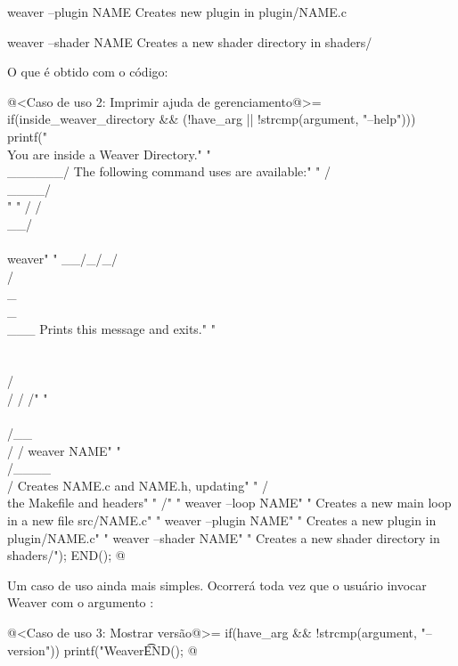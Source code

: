 {                          weaver --plugin NAME
                           Creates new plugin in plugin/NAME.c

                          weaver --shader NAME
                           Creates a new shader directory in shaders/
\alinhanormal

O que é obtido com o código:

\iniciocodigo
@<Caso de uso 2: Imprimir ajuda de gerenciamento@>=
if(inside_weaver_directory && (!have_arg || !strcmp(argument, "--help"))){
  printf("       \\                You are inside a Weaver Directory.\n"
  "        \\______/        The following command uses are available:\n"
  "        /\\____/\\\n"
  "       / /\\__/\\ \\       weaver\n"
  "    __/_/_/\\/\\_\\_\\___     Prints this message and exits.\n"
  "      \\ \\ \\/\\/ / /\n"
  "       \\ \\/__\\/ /       weaver NAME\n"
  "        \\/____\\/          Creates NAME.c and NAME.h, updating\n"
  "        /      \\          the Makefile and headers\n"
  "       /\n"
  "                        weaver --loop NAME\n"
  "                         Creates a new main loop in a new file src/NAME.c\n\n"
  "                        weaver --plugin NAME\n"
  "                         Creates a new plugin in plugin/NAME.c\n\n"
  "                        weaver --shader NAME\n"
  "                         Creates a new shader directory in shaders/\n");
  END();
}
@
\fimcodigo


Um caso de uso ainda mais simples. Ocorrerá toda vez que o usuário
invocar Weaver com o argumento :

\iniciocodigo
@<Caso de uso 3: Mostrar versão@>=
if(have_arg && !strcmp(argument, "--version")){
  printf("Weaver\t%
  END();
}
@
\fimcodigo

}
